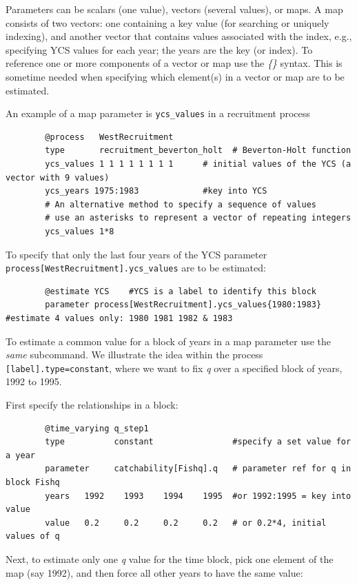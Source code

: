 Parameters can be scalars (one value), vectors (several values), or maps. A map consists of two vectors: one containing a key value (for searching or uniquely indexing), and another vector that contains values associated with the index, e.g., specifying YCS values for each year; the years are the key (or index). To reference one or more components of a vector or map use the \textit{\{\}} syntax. This is sometime needed when specifying which element(s) in a vector or map are to be estimated.

An example of a map parameter is \texttt{ycs\_values} in a recruitment process

{\small{\begin{verbatim}
		@process   WestRecruitment
		type       recruitment_beverton_holt  # Beverton-Holt function
		ycs_values 1 1 1 1 1 1 1 1      # initial values of the YCS (a vector with 9 values)
		ycs_years 1975:1983             #key into YCS
		# An alternative method to specify a sequence of values
		# use an asterisks to represent a vector of repeating integers
		ycs_values 1*8
\end{verbatim}}}

To specify that only the last four years of the YCS parameter \texttt{process[WestRecruitment].ycs\_values} are to be  estimated:

{\small{\begin{verbatim}
		@estimate YCS    #YCS is a label to identify this block
		parameter process[WestRecruitment].ycs_values{1980:1983}  #estimate 4 values only: 1980 1981 1982 & 1983
\end{verbatim}}}

To estimate a common value for a block of years in a map parameter use the \textit{same} subcommand. We illustrate the idea within the process \texttt{[label].type=constant}, where we want to fix \textit{q} over a specified block of years, 1992 to 1995.

First specify the relationships in a  block:

{\small{\begin{verbatim}
		@time_varying q_step1
		type          constant                #specify a set value for a year
		parameter     catchability[Fishq].q   # parameter ref for q in block Fishq
		years 	1992	1993	1994	1995  #or 1992:1995 = key into value
		value 	0.2		0.2		0.2		0.2   # or 0.2*4, initial values of q
\end{verbatim}}}

Next, to estimate only one \textit{q} value for the time block, pick one element of the map (say 1992), and then force all other years to have the same value:

